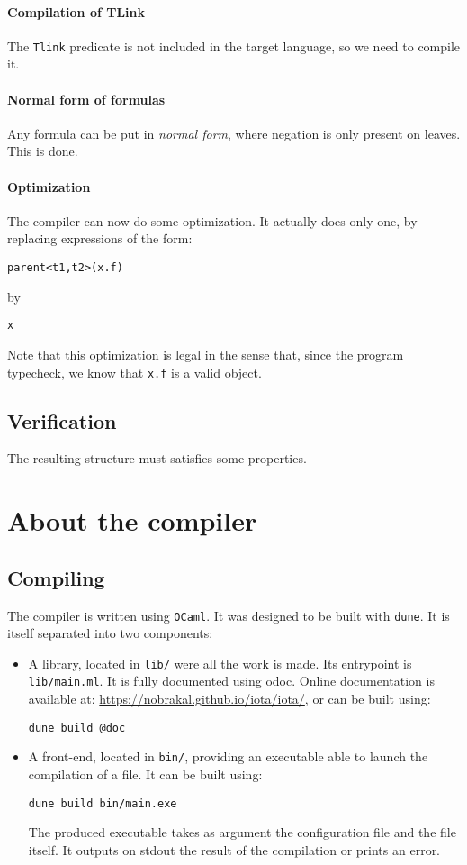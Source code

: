 \documentclass[10pt,a4paper]{article}
\newcommand{\ocaml}{\texttt}
\begin{document}
\paragraph{Compilation of TLink}
The \ocaml{Tlink} predicate is not included in the target language, so we need to compile it.

\paragraph{Normal form of formulas}
Any formula can be put in \emph{normal form}, where negation is only present on leaves. This is done.

\paragraph{Optimization}
The compiler can now do some optimization. It actually does only one, by replacing expressions of the form:
\begin{verbatim}
parent<t1,t2>(x.f)
\end{verbatim}
by
\begin{verbatim}
x
\end{verbatim}
Note that this optimization is legal in the sense that, since the program typecheck, we know that \ocaml{x.f} is a valid object.

\subsection{Verification}
The resulting structure must satisfies some properties.

\section{About the compiler}
\subsection{Compiling}
The compiler is written using \verb|OCaml|. It was designed to be built with \verb|dune|. It is itself separated into two components:

\begin{itemize}
\item A library, located in \verb|lib/| were all the work is made. Its entrypoint is \verb|lib/main.ml|. It is fully documented using odoc\cite{odoc}. Online documentation is available at: \url{https://nobrakal.github.io/iota/iota/}, or can be built using:
\begin{verbatim}
dune build @doc
\end{verbatim}
\item A front-end, located in \verb|bin/|, providing an executable able to launch the compilation of a file. It can be built using:
\begin{verbatim}
dune build bin/main.exe
\end{verbatim}
  The produced executable takes as argument the configuration file and the file itself. It outputs on stdout the result of the compilation or prints an error.
\end{itemize}
\end{document}
